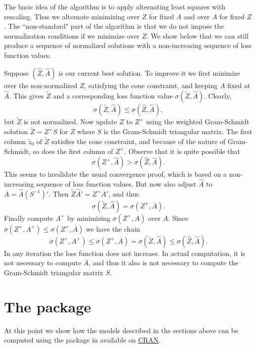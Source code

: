 \documentclass[article, nojss]{jss}
\begin{document}
The basic idea of the algorithm is to apply alternating least squares with rescaling.
Thus we alternate minimizing over $Z$ for fixed $A$ and over $A$ for fixed $Z$.
The ``non-standard" part of the algorithm is that we do not impose the normalization
conditions if we minimize over $Z$. We show below that we can still produce a
sequence of normalized solutions with a non-increasing sequence of loss function
values.

Suppose $(\hat Z,\hat A)$ is our current best solution. To improve it we  first minimize over the non-normalized $Z$, satisfying the cone constraint, and keeping $A$ fixed at $\hat A$. This gives $\tilde Z$ and a corresponding loss function value $\sigma(\tilde Z,\hat A)$. Clearly,
\begin{equation}
\sigma(\tilde Z,\hat A)\leq\sigma(\hat Z,\hat A),
\end{equation}
but $\tilde Z$ is not normalized. Now update $Z$ to $Z^+$ using the weighted Gram-Schmidt solution $\tilde Z=Z^+S$ for $Z$ where $S$ is the Gram-Schmidt triangular matrix. The first column $\tilde z_0$ of $\tilde Z$ satisfies the cone constraint, and because of the nature of Gram-Schmidt, so does the first column of $Z^+$. Observe that it is quite possible that
\begin{equation}
\sigma(Z^+,\hat A)>\sigma(\hat Z,\hat A).
\end{equation}
This seems to invalidate the usual convergence proof, which is based on
a non-increasing sequence of loss function values. But now also adjust
$\hat A$ to $\overline A=\hat A(S^{-1})'$. Then $\tilde Z\hat A'=Z^+\overline A'$, and thus
\begin{equation}
\sigma(\tilde Z,\hat A)=\sigma(Z^+,\overline A).
\end{equation}
Finally compute $A^+$ by minimizing $\sigma(Z^+,A)$ over $A$. Since $\sigma(Z^+,A^+)\leq\sigma(Z^+,\overline A)$ 
we have the chain
\begin{equation}
\sigma(Z^+,A^+)\leq\sigma(Z^+,\overline A)=\sigma(\tilde Z,\hat A)\leq\sigma(\hat Z,\hat A).
\end{equation}
In any iteration the loss function does not increase. In actual computation, it is not necessary to compute 
$\overline A$, and thus it also is not necessary to compute the Gram-Schmidt triangular matrix $S$.

\section[The R package homals]{The  package }
\label{sec:R}
At this point we show how the models described in the sections above can be computed using the package  in  \citep{R:07} available on \href{http://cran.r-project.org}{CRAN}.
\end{document}
